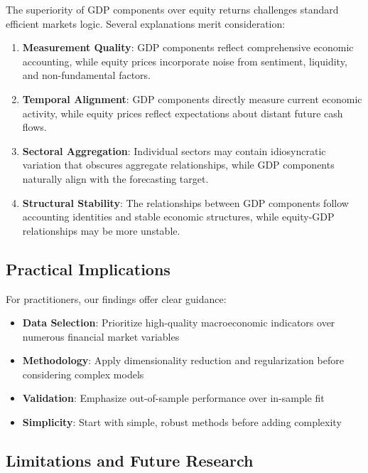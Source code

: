 \documentclass[11pt,letterpaper]{article}
\theoremstyle{plain}
\theoremstyle{definition}
\theoremstyle{remark}
\begin{document}
The superiority of GDP components over equity returns challenges standard efficient markets logic. Several explanations merit consideration:

\begin{enumerate}
\item \textbf{Measurement Quality}: GDP components reflect comprehensive economic accounting, while equity prices incorporate noise from sentiment, liquidity, and non-fundamental factors.

\item \textbf{Temporal Alignment}: GDP components directly measure current economic activity, while equity prices reflect expectations about distant future cash flows.

\item \textbf{Sectoral Aggregation}: Individual sectors may contain idiosyncratic variation that obscures aggregate relationships, while GDP components naturally align with the forecasting target.

\item \textbf{Structural Stability}: The relationships between GDP components follow accounting identities and stable economic structures, while equity-GDP relationships may be more unstable.
\end{enumerate}

\subsection{Practical Implications}

For practitioners, our findings offer clear guidance:

\begin{itemize}
\item \textbf{Data Selection}: Prioritize high-quality macroeconomic indicators over numerous financial market variables
\item \textbf{Methodology}: Apply dimensionality reduction and regularization before considering complex models
\item \textbf{Validation}: Emphasize out-of-sample performance over in-sample fit
\item \textbf{Simplicity}: Start with simple, robust methods before adding complexity
\end{itemize}

\subsection{Limitations and Future Research}
\end{document}
